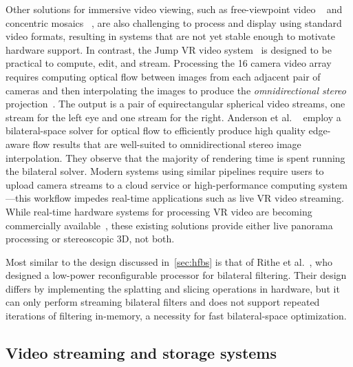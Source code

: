 Other solutions for immersive video viewing, such as free-viewpoint video ~\cite{carranza2003free} and concentric mosaics ~\cite{shum2005virtual}, are also challenging to process and display using standard video formats, resulting in systems that are not yet stable enough to motivate hardware support.
In contrast, the Jump VR video system~\cite{googlejump} is designed to be practical to compute, edit, and stream.
Processing the 16 camera video array requires computing optical flow between images from each adjacent pair of cameras and then interpolating the images to produce the \emph{omnidirectional stereo} projection~\cite{peleg2001}.
The output is a pair of equirectangular spherical video streams, one stream for the left eye and one stream for the right.
Anderson et al. ~\cite{googlejump} employ a bilateral-space solver for optical flow to efficiently produce high quality edge-aware flow results that are well-suited to omnidirectional stereo image interpolation.
They observe that the majority of rendering time is spent running the bilateral solver.
Modern systems using similar pipelines require users to upload camera streams to a cloud service or high-performance computing system---this workflow impedes real-time applications such as live VR video streaming.
While real-time hardware systems for processing VR video are becoming commercially available~\cite{gopro,sphere,vahana}, these existing solutions provide either live panorama processing or stereoscopic 3D, not both.

Most similar to the design discussed in~\ref{sec:hfbs} is that of Rithe et al.~\cite{bilat_isscc}, who designed a low-power reconfigurable processor for bilateral filtering.
Their design differs by implementing the splatting and slicing operations in hardware, but it can only perform streaming bilateral filters and does not support repeated iterations of filtering in-memory, a necessity for fast bilateral-space optimization.

\subsection{Video streaming and storage systems}
\label{sec:related:streaming}

